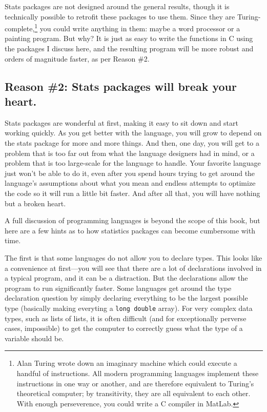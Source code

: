 Stats packages are not designed around the general results, though
it is technically possible to retrofit these packages to use them. Since
they are Turing-complete,\footnote{Alan Turing wrote down an imaginary
machine which could execute a handful of instructions.  All
modern programming languages implement these instructions in one way or
another, and are therefore equivalent to Turing's theoretical computer;
by transitivity, they are all equivalent to each other. With enough
perseverence, you could
write a C compiler in MatLab.} you could
write anything in them: maybe a word processor or a painting program. But
why? It is just as easy to write the functions in C using the packages I discuss
here, and the resulting program will be more robust and orders of
magnitude faster, as per Reason \#2.
	\fi

\subsection{Reason \#2: Stats packages will break your heart.} Stats packages
are wonderful at first, making it easy to sit down and start working
quickly. As you get better with the language, you will 
grow to depend on the stats package for more and more
things. And then, one day, you will get to a problem that is too far
out from what the language designers had in mind, or a problem that is
too large-scale for the language to handle. Your favorite language just
won't be able to do it, even after you spend hours trying to get around
the language's assumptions about what you mean and endless attempts to
optimize the code so it will run a little bit faster. And after all that,
you will have nothing but a broken heart.

A full discussion of programming languages is beyond the scope of this book, but
here are a few hints as to how statistics packages can become cumbersome with
time. 

The first is that some languages do not allow you to declare types. This
looks like a convenience at first---you will see that there are a
lot of declarations involved in a typical program, and it can be a
distraction. But the declarations allow the program to run significantly
faster. Some languages get around the type declaration question by simply
declaring everything to be the largest possible type (basically making
everyting a {\tt long double} array).  For very complex data types,
such as lists of lists, it is often difficult (and for exceptionally
perverse cases, impossible) to get the computer to correctly guess what the
type of a variable should be.

